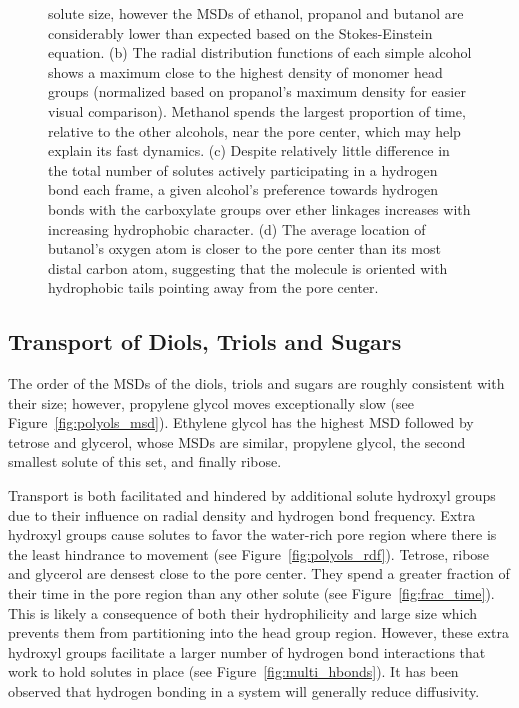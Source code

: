 \documentclass[journal=jpcbfk,manuscript=article]{achemso}
\begin{document}
\begin{figure}[!htb]
{  solute size, however the MSDs of ethanol, propanol and butanol are considerably
  lower than expected based on the Stokes-Einstein equation. (b) The radial 
  distribution functions of each simple alcohol shows a maximum close to the
  highest density of monomer head groups (normalized based on propanol's maximum
  density for easier visual comparison). Methanol spends the largest proportion 
  of time, relative to the other alcohols, near the pore center, which may help
  explain its fast dynamics. (c) Despite relatively little difference in the 
  total number of solutes actively participating in a hydrogen bond each frame,
  a given alcohol's preference towards hydrogen bonds with the carboxylate groups
  over ether linkages increases with increasing hydrophobic character. (d) The average location of 
  butanol's oxygen atom is closer to the pore center than its most distal carbon
  atom, suggesting that the molecule is oriented with hydrophobic tails pointing
  away from the pore center.}\label{fig:simple_alcohols}
  \end{figure}

  \subsection{Transport of Diols, Triols and Sugars}\label{section:polyols}
  
  The order of the MSDs of the diols, triols and sugars are roughly consistent with 
  their size; however, propylene glycol moves exceptionally slow (see 
  Figure~\ref{fig:polyols_msd}). Ethylene glycol has the highest MSD followed
  by tetrose and glycerol, whose MSDs are similar, propylene glycol, the second
  smallest solute of this set, and finally ribose.
  
  Transport is both facilitated and hindered by additional solute hydroxyl groups
  due to their influence on radial density and hydrogen bond frequency. Extra 
  hydroxyl groups cause solutes to favor the water-rich pore region where there 
  is the least hindrance to movement (see Figure~\ref{fig:polyols_rdf}). Tetrose,
  ribose and glycerol are densest close to the pore center. They spend a greater
  fraction of their time in the pore region than any other solute (see 
  Figure~\ref{fig:frac_time}). This is likely a consequence of both their 
  hydrophilicity and large size which prevents them from partitioning into the 
  head group region. However, these extra hydroxyl groups facilitate a larger 
  number of hydrogen bond interactions that work to hold solutes in place (see 
  Figure~\ref{fig:multi_hbonds}). It has been observed that hydrogen bonding 
  in a system will generally reduce diffusivity.~\cite{srinivas_computer_1999}
  
\end{document}

